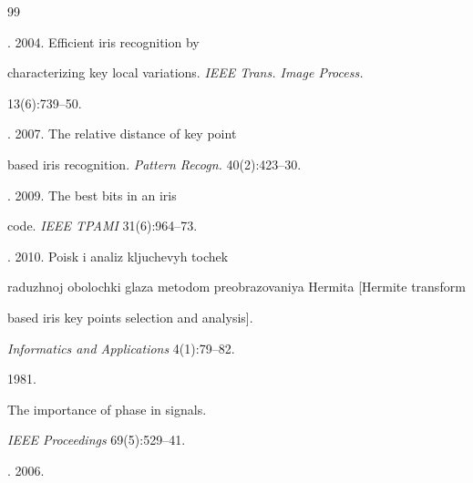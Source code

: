  {\small\frenchspacing


{%




\begin{thebibliography}{99}





\vspace*{-3pt}







. 2004. Efficient iris recognition by 


characterizing key local variations. \textit{IEEE Trans. Image Process.} 


13(6):739--50. 







. 2007. The relative distance of key point 


based iris recognition. \textit{Pattern Recogn.} 40(2):423--30.




. 2009. The best bits in an iris 


code. \textit{IEEE TPAMI} 31(6):964--73.







. 2010. Poisk i analiz kljuchevyh tochek 


raduzhnoj obolochki glaza metodom preobrazovaniya Hermita [Hermite transform 


based iris key points selection and analysis]. 


\textit{Informatics and Applications} 4(1):79--82.




 1981.


The importance of phase in signals. 


\textit{IEEE Proceedings} 69(5):529--41.




. 2006.



\end{thebibliography}}}

